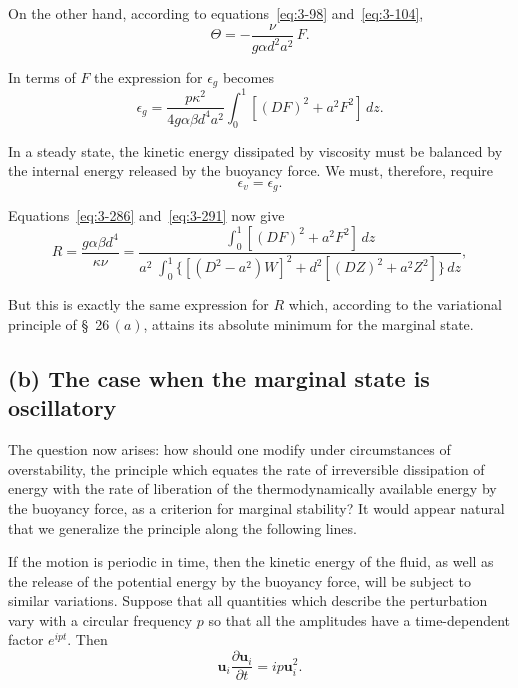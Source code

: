On the other hand, according to equations~\eqref{eq:3-98} and~\eqref{eq:3-104},
\begin{equation}\label{eq:3-290}
\Theta = -\frac{\nu}{g\alpha d^2 a^2}\,F.
\end{equation}

In terms of $F$ the expression for $\epsilon_g$ becomes
\begin{equation}\label{eq:3-291}
\epsilon_g = \frac{p\kappa^2}{4g\alpha\beta d^4 a^2}\int_0^1 [(DF)^2 + a^2 F^2]\,dz.
\end{equation}

In a steady state, the kinetic energy dissipated by viscosity must be balanced by the internal energy released by the buoyancy force. We must, therefore, require
\begin{equation}\label{eq:3-292}
\epsilon_v = \epsilon_g.
\end{equation}

Equations~\eqref{eq:3-286} and~\eqref{eq:3-291} now give
\begin{equation}\label{eq:3-293}
R = \frac{g\alpha\beta d^4}{\kappa\nu} = \frac{\displaystyle\int_0^1 [(DF)^2 + a^2 F^2]\,dz}{a^2\;\displaystyle\int_0^1 \{[(D^2 - a^2)W]^2 + d^2 [(DZ)^2 + a^2 Z^2]\}\,dz},
\end{equation}

\noindent But this is exactly the same expression for $R$ which, according to the variational principle of \S~26\,$(a)$, attains its absolute minimum for the marginal state.

\subsection*{(b) The case when the marginal state is oscillatory}

The question now arises: how should one modify under circumstances of overstability, the principle which equates the rate of irreversible dissipation of energy with the rate of liberation of the thermodynamically available energy by the buoyancy force, as a criterion for marginal stability? It would appear natural that we generalize the principle along the following lines.

If the motion is periodic in time, then the kinetic energy of the fluid, as well as the release of the potential energy by the buoyancy force, will be subject to similar variations. Suppose that all quantities which describe the perturbation vary with a circular frequency $p$ so that all the amplitudes have a time-dependent factor $e^{ipt}$. Then
\begin{equation}\label{eq:3-294}
\mathbf{u}_i\frac{\partial \mathbf{u}_i}{\partial t} = ip\mathbf{u}_i^2.
\end{equation}

